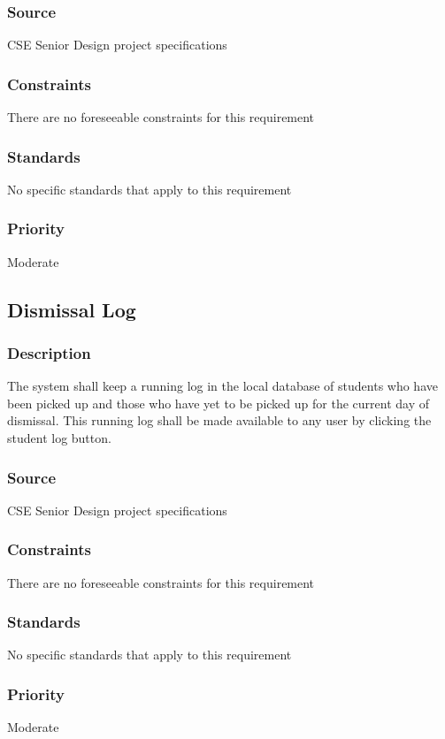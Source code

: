 \subsubsection{Source}
CSE Senior Design project specifications
\subsubsection{Constraints}
There are no foreseeable constraints for this requirement  
\subsubsection{Standards}
No specific standards that apply to this requirement
\subsubsection{Priority}
Moderate



\subsection{Dismissal Log}
\subsubsection{Description}
The system shall keep a running log in the local database of students who have been 
picked up and those who have yet to be picked up for the current day of dismissal. 
This running log shall be made available to any user by clicking the student log 
button. 
\subsubsection{Source}
CSE Senior Design project specifications
\subsubsection{Constraints}
There are no foreseeable constraints for this requirement  
\subsubsection{Standards}
No specific standards that apply to this requirement
\subsubsection{Priority}
Moderate



